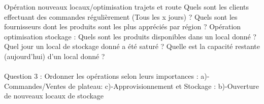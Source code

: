Opération nouveaux locaux/optimisation trajets et route 
Quels sont les clients effectuant des commandes régulièrement (Tous les x jours) ?  
Quels sont les fournisseurs dont les produits sont les plus appréciés par région ?
Opération optimisation stockage : 
Quels sont les produits disponibles dans un local donné ?
Quel jour un local de stockage donné a été saturé ? 
Quelle est la capacité restante (aujourd’hui) d’un local donné ?


\paragraph {} Question 3 : Ordonner les opérations selon leurs importances :
a)-Commandes/Ventes de plateau: 
c)-Approvisionnement et Stockage :
b)-Ouverture de nouveaux locaux de stockage 


